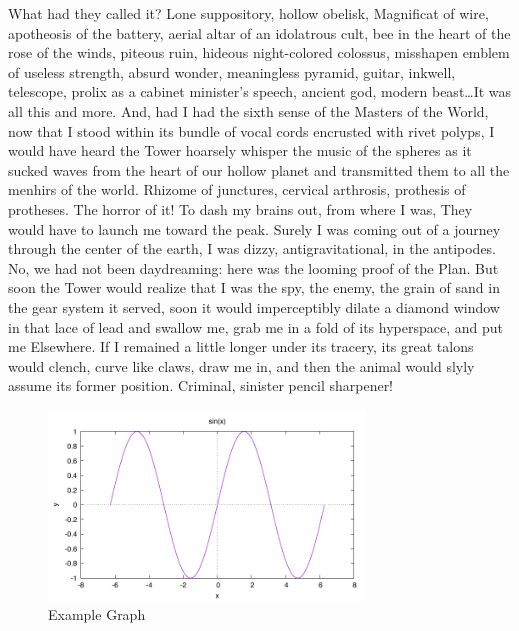 \documentclass[11pt]{article}
\begin{document}
What had they called it? Lone suppository, hollow obelisk, Magnificat
of wire, apotheosis of the battery, aerial altar of an idolatrous
cult, bee in the heart of the rose of the winds, piteous ruin,
hideous night-colored colossus, misshapen emblem of useless strength,
absurd wonder, meaningless pyramid, guitar, inkwell, telescope,
prolix as a cabinet minister’s speech, ancient god, modern beast\ldots It
was all this and more. And, had I had the sixth sense of the Masters
of the World, now that I stood within its bundle of vocal cords
encrusted with rivet polyps, I would have heard the Tower hoarsely
whisper the music of the spheres as it sucked waves from the heart
of our hollow planet and transmitted them to all the menhirs of the
world. Rhizome of junctures, cervical arthrosis, prothesis of
protheses. The horror of it! To dash my brains out, from where I
was, They would have to launch me toward the peak. Surely I was
coming out of a journey through the center of the earth, I was
dizzy, antigravitational, in the antipodes.  No, we had not been
daydreaming: here was the looming proof of the Plan. But soon the
Tower would realize that I was the spy, the enemy, the grain of
sand in the gear system it served, soon it would imperceptibly
dilate a diamond window in that lace of lead and swallow me, grab
me in a fold of its hyperspace, and put me Elsewhere.  If I remained
a little longer under its tracery, its great talons would clench,
curve like claws, draw me in, and then the animal would slyly assume
its former position. Criminal, sinister pencil sharpener!

\begin{figure}[tbp]
\begin{centering}
\includegraphics[width=0.75\textwidth]{figures/sinplot.pdf}
\caption{Example Graph}\label{fig:ex}
\end{centering}
\end{figure}
\end{document}
